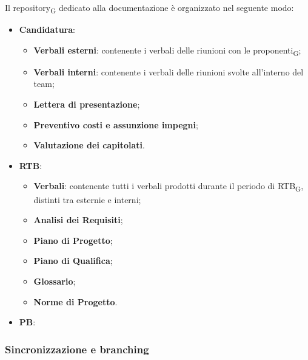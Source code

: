 Il {repository\textsubscript{G}} dedicato alla documentazione è organizzato nel seguente modo:
\begin{itemize}
    \item \textbf{Candidatura}:
    \begin{itemize}
        \item \textbf{Verbali esterni}: contenente i verbali delle riunioni con le {proponenti\textsubscript{G}};
        \item \textbf{Verbali interni}: contenente i verbali delle riunioni svolte all'interno del team;
        \item \textbf{Lettera di presentazione};
        \item \textbf{Preventivo costi e assunzione impegni};
        \item \textbf{Valutazione dei capitolati}.
    \end{itemize}
    \item \textbf{RTB}:
    \begin{itemize}
        \item \textbf{Verbali}: contenente tutti i verbali prodotti durante il periodo di {RTB\textsubscript{G}}, distinti tra esternie e interni;
        \item \textbf{Analisi dei Requisiti};
        \item \textbf{Piano di Progetto};
        \item \textbf{Piano di Qualifica};
        \item \textbf{Glossario};
        \item \textbf{Norme di Progetto}.
    \end{itemize}
    \item \textbf{PB}:
\end{itemize}

\subsubsection{Sincronizzazione e branching}

